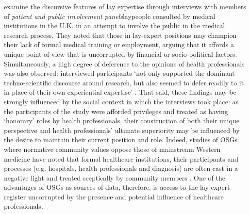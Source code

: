 \textcite{thompson_credibility_2012} examine the discursive features of lay expertise through interviews with members of \emph{patient and public involvement panels}\textemdash{}laypeople consulted by medical institutions in the U.K. in an attempt to involve the public in the medical research process. They noted that those in lay\hyp{}expert positions may champion their lack of formal medical training or employment, arguing that it affords a unique point of view that is uncorrupted by financial or socio\hyp{}political factors. Simultaneously, a high degree of deference to the opinions of health professionals was also observed: interviewed participants `not only supported the dominant techno\hyp{}scientific discourse around research, but also seemed to defer readily to it in place of their own experiential expertise' \parencite*[p.~609]{thompson_credibility_2012}. That said, these findings may be strongly influenced by the social context in which the interviews took place: as the participants of the study were afforded privileges and treated as having `honorary' roles by health professionals, their construction of both their unique perspective and health professionals' ultimate superiority may be influenced by the desire to maintain their current position and role. Indeed, studies of \glspl{OSG} where normative community values oppose those of mainstream Western medicine have noted that formal healthcare institutions, their participants and processes (e.g. hospitals, health professionals and diagnosis) are often cast in a negative light and treated sceptically by community members \cite{mulveen_interpretative_2006}. One of the advantages of \glspl{OSG} as sources of data, therefore, is access to the lay\hyp{}expert register uncorrupted by the presence and potential influence of healthcare professionals.




